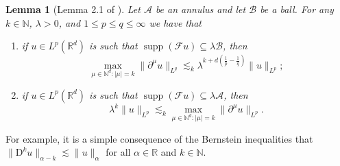 \documentclass[11pt,a4paper]{article}
\newcommand{\mathD}{\mathrm{D}}
\newcommand{\tmop}[1]{\ensuremath{\operatorname{#1}}}
\newenvironment{enumeratenumeric}{\begin{enumerate}[1.] }{\end{enumerate}}
\newtheorem{lemma}[theorem]{Lemma}
\theoremstyle{remark}
\newcommand{\R}{\mathbb{R}}
\newcommand{\N}{\mathbb{N}}
\newcommand{\CA}{\ensuremath{\mathscr{A}}}
\newcommand{\CB}{\ensuremath{\mathscr{B}}}
\newcommand{\CF}{\ensuremath{\mathscr{F}}}
\begin{document}
\begin{lemma}[Lemma 2.1 of {\cite{Bahouri2011}}]\label{lemma:Bernstein}
   Let $\CA$ be an annulus and let $\CB$ be a ball. For any $k \in \mathbb{N}$, $\lambda >0$, and $1 \leqslant p \leqslant q \leqslant \infty$ we have that
   \begin{enumeratenumeric}
      \item if $u \in L^{p} ( \mathbb{R}^{d} )$ is such that $\tmop{supp} ( \CF u ) \subseteq \lambda \CB$, then
         \[
            \max_{\mu \in \mathbb{N}^{d} : | \mu | = k} \| \partial^{\mu} u \|_{L^{q}} \lesssim_{k} \lambda^{k+d \left( \frac{1}{p} - \frac{1}{q} \right)} \| u \|_{L^{p}};
         \]
      \item if $u \in L^{p} ( \mathbb{R}^{d} )$ is such that $\tmop{supp} (\CF u ) \subseteq \lambda \CA$, then
         \[
            \lambda^{k} \| u \|_{L^{p}} \lesssim_{k} \max_{\mu \in \mathbb{N}^{d}: | \mu | = k} \| \partial^{\mu} u \|_{L^{p}} .
         \]
  \end{enumeratenumeric}
\end{lemma}

For example, it is a simple consequence of the Bernstein inequalities that $\| \mathD^k u \|_{\alpha-k} \lesssim \| u \|_\alpha$ for all $\alpha \in \R$ and $k \in \N$.
\end{document}
